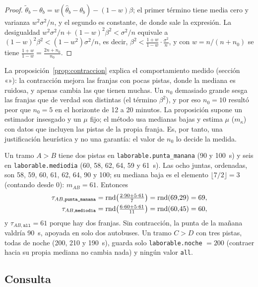 \begin{proof}
$\tilde\theta_b-\theta_b=w(\hat\theta_b-\theta_b)-(1-w)\beta$; el primer término tiene media cero y varianza
$w^2\sigma^2/n$, y el segundo es constante, de donde sale la expresión. La desigualdad
$w^2\sigma^2/n+(1-w)^2\beta^2<\sigma^2/n$ equivale a $(1-w)^2\beta^2<(1-w^2)\sigma^2/n$, es decir,
$\beta^2<\frac{1+w}{1-w}\cdot\frac{\sigma^2}{n}$, y con $w=n/(n+n_0)$ se tiene $\frac{1+w}{1-w}=\frac{2n+n_0}{n_0}$.
\end{proof}

La proposición~\ref{prop:contraccion} explica el comportamiento medido (sección «»): la
contracción mejora las franjas con pocas pistas, donde la mediana es ruidosa, y apenas cambia las que tienen muchas. Un
$n_0$ demasiado grande sesga las franjas que de verdad son distintas (el término $\beta^2$), y por eso $n_0=10$ resultó
peor que $n_0=5$ en el horizonte de 12 a 20 minutos. La proposición supone un estimador insesgado y un $\mu$ fijo; el
método usa medianas bajas y estima $\mu$ ($m_\kappa$) con datos que incluyen las pistas de la propia franja. Es, por
tanto, una justificación heurística y no una garantía: el valor de $n_0$ lo decide la medida.

\begin{ejemplo}
\label{ej:contraccion}
Un tramo $A{>}B$ tiene dos pistas en \texttt{laborable.punta\_manana} (90 y 100~s) y seis en
\texttt{laborable.mediodia} (60, 58, 62, 64, 59 y 61~s). Las ocho juntas, ordenadas, son 58, 59, 60, 61, 62, 64, 90 y
100; su mediana baja es el elemento $\lfloor 7/2\rfloor=3$ (contando desde 0): $m_{AB}=61$. Entonces
\begin{align*}
\tau_{AB,\texttt{punta\_manana}}&=\operatorname{rnd}\!\left(\tfrac{2\cdot90+5\cdot61}{7}\right)=\operatorname{rnd}(69{,}29)=69,\\
\tau_{AB,\texttt{mediodia}}&=\operatorname{rnd}\!\left(\tfrac{6\cdot60+5\cdot61}{11}\right)=\operatorname{rnd}(60{,}45)=60,
\end{align*}
y $\tau_{AB,\texttt{all}}=61$ porque hay dos franjas. Sin contracción, la punta de la mañana valdría 90~s, apoyada en
solo dos autobuses. Un tramo $C{>}D$ con tres pistas, todas de noche (200, 210 y 190~s), guarda solo
\texttt{laborable.noche} $=200$ (contraer hacia su propia mediana no cambia nada) y ningún valor \texttt{all}.
\end{ejemplo}

\subsection{Consulta}

